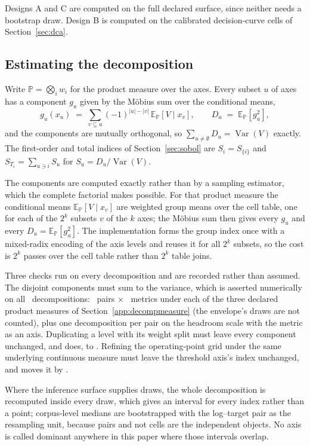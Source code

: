 Designs A and C are computed on the full declared surface, since neither needs
a bootstrap draw. Design B is computed on the calibrated decision-curve cells
of Section~\ref{sec:dca}.

\subsection*{Estimating the decomposition}
\label{app:sobolest}

Write $\mathbb{P} = \bigotimes_i w_i$ for the product measure over the axes.
Every subset $u$ of axes has a component $g_u$ given by the M\"obius sum over
the conditional means,
\[
g_u(x_u) \;=\; \sum_{v \subseteq u} (-1)^{|u| - |v|}\,
\mathbb{E}_{\mathbb{P}}\!\left[V \mid x_v\right],
\qquad
D_u \;=\; \mathbb{E}_{\mathbb{P}}\!\left[g_u^2\right],
\]
and the components are mutually orthogonal, so
$\sum_{u \neq \emptyset} D_u = \operatorname{Var}(V)$ exactly. The first-order
and total indices of Section~\ref{sec:sobol} are $S_i = S_{\{i\}}$ and
$S_{T_i} = \sum_{u \ni i} S_u$ for $S_u = D_u/\operatorname{Var}(V)$.

The components are computed exactly rather than by
a sampling estimator, which the complete factorial makes possible. For that
product measure the conditional means
$\mathbb{E}_{\mathbb{P}}[V \mid x_v]$ are weighted group means over the cell
table, one for each of the $2^k$ subsets $v$ of the $k$ axes; the M\"obius sum
then gives every $g_u$ and every $D_u = \mathbb{E}_{\mathbb{P}}[g_u^2]$. The
implementation forms the group index once with a mixed-radix encoding of the
axis levels and reuses it for all $2^k$ subsets, so the cost is $2^k$ passes
over the cell table rather than $2^k$ table joins.

Three checks run on every decomposition and are recorded rather than assumed.
The disjoint components must sum to the variance, which is asserted
numerically on all \nDecompositions\ decompositions: \nPairs\ pairs $\times$
\nInstruments\ metrics under each of the three declared product measures
of Section~\ref{app:decompmeasure} (the envelope's draws are not counted), plus
one decomposition per pair on the headroom scale with the metric as an
axis. Duplicating a level with
its weight split must leave every component unchanged, and does, to
\invarianceDuplicateShift. Refining the operating-point grid under the same
underlying continuous measure must leave the threshold axis's index unchanged,
and moves it by \invarianceGridShift.

Where the inference surface supplies draws, the whole decomposition is
recomputed inside every draw, which gives an interval for every index rather
than a point; corpus-level medians are bootstrapped with the log--target pair
as the resampling unit, because pairs and not cells are the independent
objects. No axis is called dominant anywhere in this paper where those
intervals overlap.

